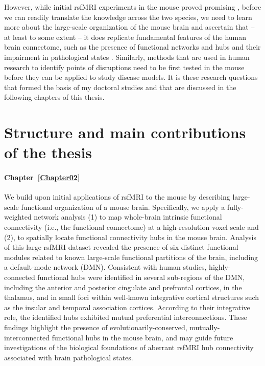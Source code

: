 However, while initial rsfMRI experiments in the mouse proved promising
\parencite{sforazzini2014}, before we can readily translate the knowledge across
the two species, we need to learn more about the large-scale organization of the
mouse brain and ascertain that -- at least to some extent -- it does replicate
fundamental features of the human brain connectome, such as the presence of
functional networks and hubs and their impairment in pathological states
\parencite{vandenheuvel2016a}. Similarly, methods that are used in human
research to identify points of disruptions need to be first tested in the mouse
before they can be applied to study disease models. It is these research
questions that formed the basis of my doctoral studies and that are discussed in
the following chapters of this thesis.

\section{Structure and main contributions of the thesis}

\paragraph{Chapter~\ref{Chapter02}} We build upon initial applications of rsfMRI to the
mouse by describing large-scale functional organization of a mouse brain.
Specifically, we apply a fully-weighted network analysis (1) to map
whole-brain intrinsic functional connectivity (i.e., the functional connectome)
at a high-resolution voxel scale and (2), to spatially locate functional
connectivity hubs in the mouse brain. Analysis of this large rsfMRI dataset
revealed the presence of six distinct functional modules related to known
large-scale functional partitions of the brain, including a default-mode network
(DMN). Consistent with human studies, highly-connected functional hubs were
identified in several sub-regions of the DMN, including the anterior and
posterior cingulate and prefrontal cortices, in the thalamus, and in small foci
within well-known integrative cortical structures such as the insular and
temporal association cortices. According to their integrative role, the
identified hubs exhibited mutual preferential interconnections. These findings
highlight the presence of evolutionarily-conserved, mutually-interconnected
functional hubs in the mouse brain, and may guide future investigations of the
biological foundations of aberrant rsfMRI hub connectivity associated with brain
pathological states.

